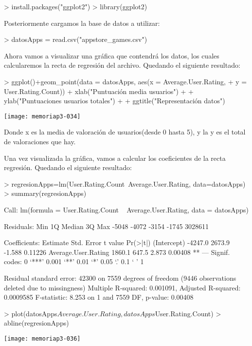 \documentclass [a4paper] {article}
\begin{document}
\begin{Schunk}
\begin{Sinput}
> install.packages("ggplot2")
> library(ggplot2)
\end{Sinput}
\end{Schunk}

Posteriormente cargamos la base de datos a utilizar:

\begin{Schunk}
\begin{Sinput}
> datosApps = read.csv("appstore_games.csv")
\end{Sinput}
\end{Schunk}

Ahora vamos a visualizar una gráfica que contendrá los datos, los cuales calcularemos la recta de regresión del archivo. 
Quedando el siguiente resultado:

\begin{Schunk}
\begin{Sinput}
> ggplot()+geom_point(data = datosApps, aes(x = Average.User.Rating, 
+ y = User.Rating.Count)) + xlab("Puntuación media usuarios") +
+ ylab("Puntuaciones usuarios totales") +
+ ggtitle("Representación datos")
\end{Sinput}
\end{Schunk}
\texttt{[image: memoriap3-034]}

Donde x es la media de valoración de usuarios(desde 0 hasta 5), y la y es el total de valoraciones que hay.

Una vez visualizada la gráfica, vamos a calcular los coeficientes de la recta regresión. Quedando el siguiente resultado:

\begin{Schunk}
\begin{Sinput}
> regresionApps=lm(User.Rating.Count~Average.User.Rating, data=datosApps)
> summary(regresionApps)
\end{Sinput}
\begin{Soutput}
Call:
lm(formula = User.Rating.Count ~ Average.User.Rating, data = datosApps)

Residuals:
    Min      1Q  Median      3Q     Max 
  -5048   -4072   -3154   -1745 3028611 

Coefficients:
                    Estimate Std. Error t value Pr(>|t|)   
(Intercept)          -4247.0     2673.9  -1.588  0.11226   
Average.User.Rating   1860.1      647.5   2.873  0.00408 **
---
Signif. codes:  0 ‘***’ 0.001 ‘**’ 0.01 ‘*’ 0.05 ‘.’ 0.1 ‘ ’ 1

Residual standard error: 42300 on 7559 degrees of freedom
  (9446 observations deleted due to missingness)
Multiple R-squared:  0.001091,	Adjusted R-squared:  0.0009585 
F-statistic: 8.253 on 1 and 7559 DF,  p-value: 0.00408
\end{Soutput}
\end{Schunk}
\begin{Schunk}
\begin{Sinput}
> plot(datosApps$Average.User.Rating, datosApps$User.Rating.Count)
> abline(regresionApps)
\end{Sinput}
\end{Schunk}
\texttt{[image: memoriap3-036]}
\end{document}
